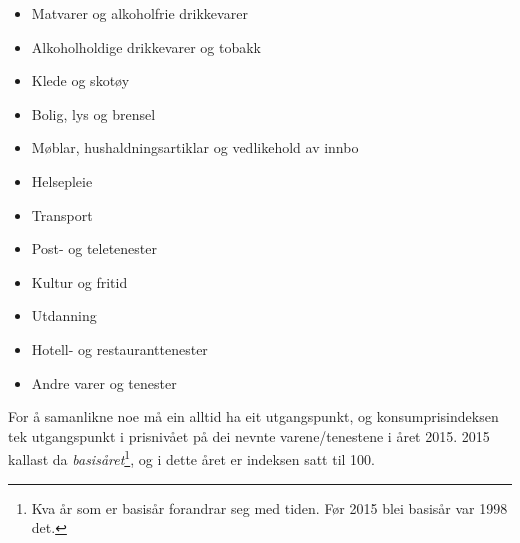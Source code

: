 \parbox[t]{0.49\linewidth}{\begin{itemize}
		\item Matvarer og alkoholfrie drikkevarer
		\item Alkoholholdige drikkevarer og tobakk
		\item Klede og skotøy
		\item Bolig, lys og brensel
		\item Møblar, hushaldningsartiklar og vedlikehold av innbo
		\item Helsepleie
\end{itemize}}
\parbox[t]{0.49\linewidth}{\begin{itemize}
		\item Transport
		\item Post- og teletenester
		\item Kultur og fritid
		\item Utdanning
		\item Hotell- og restauranttenester
		\item Andre varer og tenester
\end{itemize}}
For å samanlikne noe må ein alltid ha eit utgangspunkt, og konsumprisindeksen tek utgangspunkt i prisnivået på dei nevnte varene/tenestene i året 2015. 2015 kallast da \textit{basisåret}\footnote{Kva år som er basisår forandrar seg med tiden. Før 2015 blei basisår var 1998 det.}, og i dette året er indeksen satt til 100.\regv
{}\vsk

